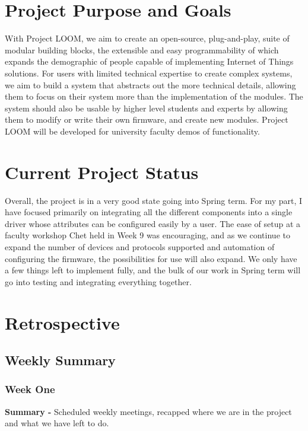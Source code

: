 \documentclass[onecolumn, draftclsnofoot,10pt, compsoc]{IEEEtran}
\begin{document}
\section{Project Purpose and Goals}
    With Project LOOM, we aim to create an open-source, plug-and-play, suite of modular building blocks, the extensible and easy programmability of which expands the demographic of people capable of implementing Internet of Things solutions. For users with limited technical expertise to create complex systems, we aim to build a system that abstracts out the more technical details, allowing them to focus on their system more than the implementation of the modules. The system should also be usable by higher level students and experts by allowing them to modify or write their own firmware, and create new modules. Project LOOM will be developed for university faculty demos of functionality.

\section{Current Project Status}
    Overall, the project is in a very good state going into Spring term. For my part, I have focused primarily on integrating all the different components into a single driver whose attributes can be configured easily by a user. The ease of setup at a faculty workshop Chet held in Week 9 was encouraging, and as we continue to expand the number of devices and protocols supported and automation of configuring the firmware, the possibilities for use will also expand. We only have a few things left to implement fully, and the bulk of our work in Spring term will go into testing and integrating everything together.

\section{Retrospective}

\subsection{Weekly Summary}
\subsubsection*{Week One}
    \begin{adjustwidth}{2.5em}{0pt}
    \textbf{Summary -} Scheduled weekly meetings, recapped where we are in the project and what we have left to do.
    \end{adjustwidth}
\end{document}
